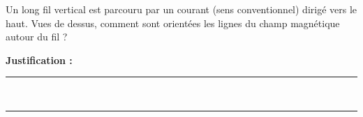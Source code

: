 Un long fil vertical est parcouru par un courant (sens conventionnel) dirigé vers le haut. Vues de dessus, comment sont orientées les lignes du champ magnétique autour du fil ?

\choices

\noindent\textbf{Justification :} \hrulefill \\[2.5ex]
\rule{\linewidth}{0.4pt} \\[2.5ex]
\rule{\linewidth}{0.4pt}
\vfill
